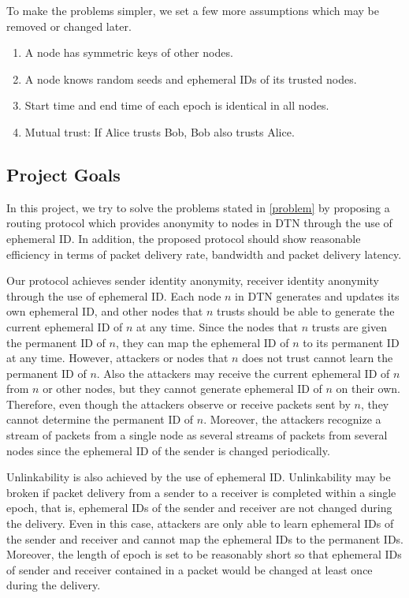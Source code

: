 \documentclass[11pt]{article}
\begin{document}
To make the problems simpler, we set a few more assumptions which may be removed or changed later. 

\begin{enumerate}
\item A node has symmetric keys of other nodes.\\
\item A node knows random seeds and ephemeral IDs of its trusted nodes. 
\item Start time and end time of each epoch is identical in all nodes. 
\item Mutual trust: If Alice trusts Bob, Bob also trusts Alice. 
\end{enumerate}


\subsection{Project Goals}
In this project, we try to solve the problems stated in \ref{problem} by proposing a routing protocol which provides anonymity to nodes in DTN through the use of ephemeral ID.  In addition, the proposed protocol should show reasonable efficiency in terms of packet delivery rate, bandwidth and packet delivery latency.  

Our protocol achieves sender identity anonymity, receiver identity anonymity through the use of ephemeral ID.  Each node $n$ in DTN generates and updates its own ephemeral ID, and other nodes that $n$ trusts should be able to generate the current ephemeral ID of $n$ at any time.  Since the nodes that  $n$ trusts are given the permanent ID of $n$, they can map the ephemeral ID of $n$ to its permanent ID at any time.  However, attackers or nodes that $n$ does not trust cannot learn the permanent ID of $n$.  Also the attackers may receive the current ephemeral ID of $n$ from $n$ or other nodes, but they cannot generate ephemeral ID of $n$ on their own.  Therefore, even though the attackers observe or receive packets sent by $n$, they cannot determine the permanent ID of $n$.  Moreover, the attackers recognize a stream of packets from a single node as several streams of packets from several nodes since the ephemeral ID of the sender is changed periodically. 

Unlinkability is also achieved by the use of ephemeral ID.  Unlinkability may be broken if packet delivery from a sender to a receiver is completed within a single epoch, that is, ephemeral IDs of the sender and receiver are not changed during the delivery.  Even in this case, attackers are only able to learn ephemeral IDs of the sender and receiver and cannot map the ephemeral IDs to the permanent IDs.  Moreover, the length of epoch is set to be reasonably short so that ephemeral IDs of sender and receiver contained in a packet would be changed at least once during the delivery. 
\end{document}
